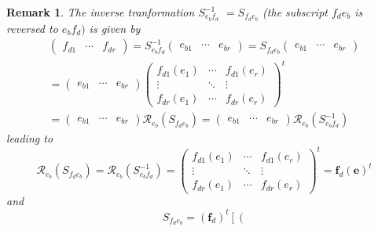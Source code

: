 \documentclass[aps,preprint]{revtex4}
\newtheorem{remark}[theorem]{Remark}
\begin{document}
\begin{remark}
The inverse tranformation $S_{e_{b}f_{d}}^{-1}$ $=S_{f_{d}e_{b}}$ (the
subscript $f_{d}e_{b}$ is reversed to $e_{b}f_{d})$ is given by 
\begin{gather}
\left( 
\begin{array}{ccc}
f_{d1} & \cdots & f_{dr}%
\end{array}%
\right) =S_{e_{b}f_{d}}^{-1}\left( 
\begin{array}{ccc}
e_{b1} & \cdots & e_{br}%
\end{array}%
\right) =S_{f_{d}e_{b}}\left( 
\begin{array}{ccc}
e_{b1} & \cdots & e_{br}%
\end{array}%
\right) \\
=\left( 
\begin{array}{ccc}
e_{b1} & \cdots & e_{br}%
\end{array}%
\right) \left( 
\begin{array}{ccc}
f_{d1}\left( e_{1}\right) & \cdots & f_{d1}\left( e_{r}\right) \\ 
\vdots & \ddots & \vdots \\ 
f_{dr}\left( e_{1}\right) & \cdots & f_{dr}\left( e_{r}\right)%
\end{array}%
\right) ^{t} \\
=\left( 
\begin{array}{ccc}
e_{b1} & \cdots & e_{br}%
\end{array}%
\right) \mathcal{R}_{e_{b}}\left( S_{f_{d}e_{b}}\right) =\left( 
\begin{array}{ccc}
e_{b1} & \cdots & e_{br}%
\end{array}%
\right) \mathcal{R}_{e_{b}}\left( S_{e_{b}f_{d}}^{-1}\right)
\end{gather}%
leading to 
\begin{equation}
\mathcal{R}_{e_{b}}\left( S_{f_{d}e_{b}}\right) =\mathcal{R}_{e_{b}}\left(
S_{e_{b}f_{d}}^{-1}\right) =\left( 
\begin{array}{ccc}
f_{d1}\left( e_{1}\right) & \cdots & f_{d1}\left( e_{r}\right) \\ 
\vdots & \ddots & \vdots \\ 
f_{dr}\left( e_{1}\right) & \cdots & f_{dr}\left( e_{r}\right)%
\end{array}%
\right) ^{t}=\boldsymbol{f}_{d}\left( \boldsymbol{e}\right) ^{t}
\end{equation}%
and 
\begin{equation}
S_{f_{d}e_{b}}=\left( \boldsymbol{f}_{d}\right) ^{t}\left[ \left( 

\end{equation}
\end{remark}
\end{document}
